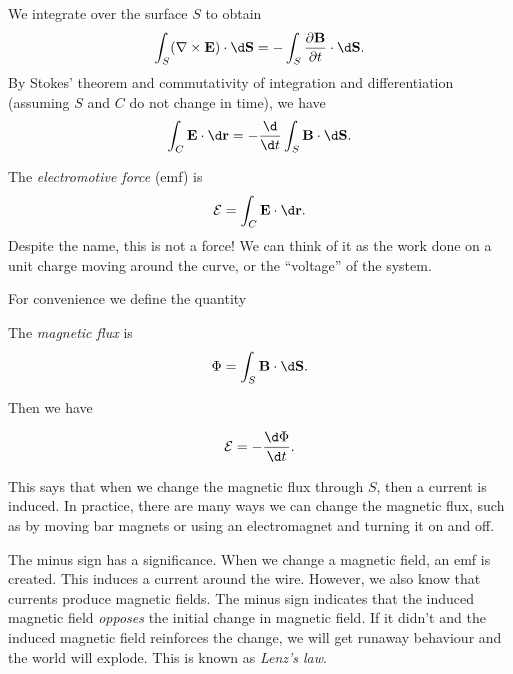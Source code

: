 \documentclass[a4paper]{article}
\begin{document}
We integrate over the surface $S$ to obtain
\[
  \int_S (\nabla\times \mathbf{E})\cdot \d \mathbf{S} = -\int_S \frac{\partial \mathbf{B}}{\partial t}\cdot \d \mathbf{S}.
\]
By Stokes' theorem and commutativity of integration and differentiation (assuming $S$ and $C$ do not change in time), we have
\[
  \int_C \mathbf{E}\cdot \d \mathbf{r} = - \frac{\d }{\d t} \int _S \mathbf{B} \cdot \d \mathbf{S}.
\]
\begin{defi}
  The \emph{electromotive force} (emf) is
  \[
    \mathcal{E} = \int_C \mathbf{E}\cdot \d \mathbf{r}.
  \]
  Despite the name, this is not a force! We can think of it as the work done on a unit charge moving around the curve, or the ``voltage'' of the system.
\end{defi}

For convenience we define the quantity
\begin{defi}
  The \emph{magnetic flux} is
  \[
    \Phi = \int_S \mathbf{B}\cdot \d \mathbf{S}.
  \]
\end{defi}
Then we have
\begin{law}
  \[
    \mathcal{E} = -\frac{\d \Phi}{\d t}.
  \]
\end{law}
This says that when we change the magnetic flux through $S$, then a current is induced. In practice, there are many ways we can change the magnetic flux, such as by moving bar magnets or using an electromagnet and turning it on and off.

The minus sign has a significance. When we change a magnetic field, an emf is created. This induces a current around the wire. However, we also know that currents produce magnetic fields. The minus sign indicates that the induced magnetic field \emph{opposes} the initial change in magnetic field. If it didn't and the induced magnetic field reinforces the change, we will get runaway behaviour and the world will explode. This is known as \emph{Lenz's law}.
\end{document}
